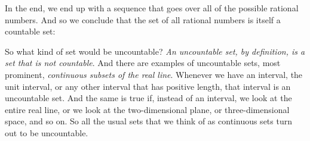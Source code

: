 \documentclass[pdftex, brazil, 12pt, twoside]{article}
\begin{document}
\begin{figure}[H]
  \begin{center}
  \end{center}
\end{figure}

In the end, we end up with a sequence that goes over all of
the possible rational numbers.
And so we conclude that the set of all rational numbers is
itself a countable set:

\begin{figure}[H]
  \begin{center}
  \end{center}
\end{figure}

So what kind of set would be uncountable?
\emph{An uncountable set, by definition, is a set that is
not countable}.
And there are examples of uncountable sets, most
prominent, \emph{continuous subsets of the real line}.
Whenever we have an interval, the unit interval, or any
other interval that has positive length, that interval
is an uncountable set.
And the same is true if, instead of an interval, we
look at the entire real line, or we look at the
two-dimensional plane, or three-dimensional
space, and so on.
So all the usual sets that we think of as continuous sets
turn out to be uncountable.

\begin{figure}[H]
  \begin{center}
  \end{center}
\end{figure}
\end{document}
